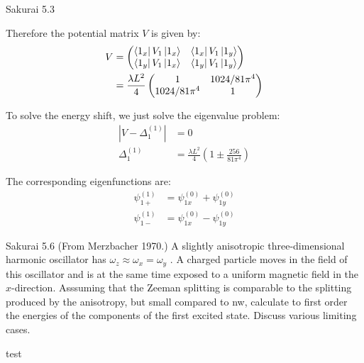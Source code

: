 \documentclass{article}
\begin{document}
\begin{section}{Sakurai 5.3}
\begin{tcolorbox}[breakable]
			Therefore the potential matrix $V$ is given by:
			\begin{align*}
				V &= \begin{pmatrix}
					\bra{1_x}V_1\ket{1_x} & \bra{1_x}V_1\ket{1_y} \\
					\bra{1_y}V_1\ket{1_x} & \bra{1_y}V_1\ket{1_y}
				\end{pmatrix} \\
				&= \frac{\lambda L^2}{4} \begin{pmatrix}
					1 & 1024/81\pi^4 \\
					1024/81\pi^4 & 1
				\end{pmatrix}
			\end{align*}

			To solve the energy shift, we just solve the eigenvalue problem:
			\begin{align*}
				|V - \Delta_1^{(1)}| &= 0 \\
				\Delta_1^{(1)} &= \frac{\lambda L^2}{4} \left( 1 \pm \frac{256}{81 \pi^4} \right)
			\end{align*}

			The corresponding eigenfunctions are:
			\begin{align*}
				\psi_{1+}^{(1)} &= \psi_{1x}^{(0)} + \psi_{1y}^{(0)} \\
				\psi_{1-}^{(1)} &= \psi_{1x}^{(0)} - \psi_{1y}^{(0)} 
			\end{align*}
		\end{tcolorbox}
	\end{section}

	\newpage
	\begin{section}{Sakurai 5.6}
		(From Merzbacher 1970.) A slightly anisotropic three-dimensional harmonic oscillator has $\omega_z \approx \omega_x = \omega_y$ . A charged particle moves in the field of this oscillator and is at the same time exposed to a uniform magnetic field in the $x$-direction. Asssuming that the Zeeman splitting is comparable to the splitting produced by the anisotropy, but small compared to nw, calculate to first order the energies of the components of the first excited state. Discuss various limiting cases.

		\begin{tcolorbox}[breakable]
			test
		\end{tcolorbox}
	\end{section}
\end{document}

